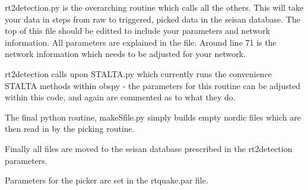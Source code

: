 \documentclass[a4paper,12pt,final]{article}
\begin{document}
rt2detection.py is the overarching routine which calls all the others.  This will
take your data in steps from raw to triggered, picked data in the seisan database.
The top of this file should be editted to include your parameters and network 
information.  All parameters are explained in the file. Around line 71 is the network
information which needs to be adjusted for your network.

rt2detection calls upon STALTA.py which currently runs the convenience STALTA methods
within obspy - the parameters for this routine can be adjusted within this code, and
again are commented as to what they do.

The final python routine, makeSfile.py simply builds empty nordic files which are then
read in by the picking routine.

Finally all files are moved to the seisan database prescribed in the rt2detection parameters.

Parameters for the picker are set in the rtquake.par file.
\end{document}
